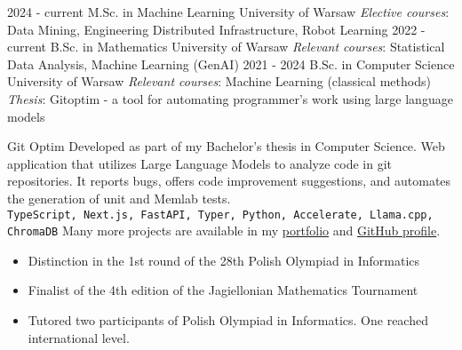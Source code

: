 \documentclass[9pt]{developercv} %
\begin{document}
\vspace{-15 pt}
\begin{entrylist}
    \entry
		{2024 - current}
		{M.Sc. in Machine Learning}
		{University of Warsaw}
		{\textsl{Elective courses}: Data Mining, Engineering Distributed Infrastructure, Robot Learning}
    \entry
		{2022 - current}
		{B.Sc. in Mathematics }
		{University of Warsaw}
		{\textsl{Relevant courses}: Statistical Data Analysis, Machine Learning (GenAI)}
    \entry
		{2021 - 2024}
		{B.Sc. in Computer Science}
		{University of Warsaw}
		{\textsl{Relevant courses}: Machine Learning (classical methods)\\ \textsl{Thesis}: Gitoptim - a tool for automating programmer's work using large language models}
\end{entrylist}

\vspace{-15 pt}
\begin{entrylist}
    \entry
		{\phantom}
		{Git Optim}
		{}
		{Developed as part of my Bachelor's thesis in Computer Science. Web application that utilizes Large Language Models to analyze code in git repositories. It reports bugs, offers code improvement suggestions, and automates the generation of unit and Memlab tests.\\[2mm]
        \texttt{TypeScript, Next.js, FastAPI, Typer, Python, Accelerate, Llama.cpp, ChromaDB}}
    \entry
		{}
		{\vspace{-3mm}}
		{}
		{Many more projects are available in my \href{https://lukasz.leszko.dev/}{portfolio} and \href{https://github.com/leszkolukasz}{GitHub profile}.}
\end{entrylist}

\vspace{-15 pt}
\vspace{-10 pt}
\begin{itemize}[parsep=0pt,partopsep=0pt,leftmargin=26mm]
    \item Distinction in the 1st round of the 28th Polish Olympiad in Informatics
    \item Finalist of the 4th edition of the Jagiellonian Mathematics Tournament
    \item Tutored two participants of Polish Olympiad in Informatics. One reached international level.
\end{itemize}
 
\end{document}
